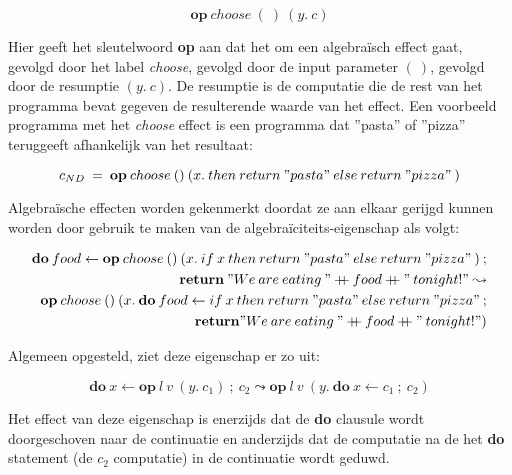 \begin{equation}
    \textbf{op} \: choose \: (\:) \: (y. \: c)
\end{equation}

Hier geeft het sleutelwoord \textbf{op} aan dat het om een algebraïsch effect gaat, gevolgd door het label \textit{choose}, gevolgd door de input parameter $(\:)$, gevolgd door de resumptie $(y. \: c)$. De resumptie is de computatie die de rest van het programma bevat gegeven de resulterende waarde van het effect. Een voorbeeld programma met het \textit{choose} effect is een programma dat ''pasta'' of ''pizza'' teruggeeft afhankelijk van het resultaat:

\begin{equation}
    c_{ND}\:=\:\textbf{op}\:choose\:()\:(x.\:then\:return\:"pasta"\:else\:return\:"pizza"\:)
\end{equation}

Algebraïsche effecten worden gekenmerkt doordat ze aan elkaar gerijgd kunnen worden door gebruik te maken van de algebraïciteits-eigenschap als volgt:

\begin{equation} \label{eq:algFood}
    \begin{split}
        \textbf{do}\:food \leftarrow \textbf{op}\:choose\:()\:(x. \: if \: x \:then\:return\:"pasta"\:else\:return\:"pizza"\:) \: ; \\ \: \textbf{return}\: "We \: are \: eating \: " \mathbin{{+}\mspace{-8mu}{+}}  food \mathbin{{+}\mspace{-8mu}{+}} " \: tonight!"  \leadsto \\
        \textbf{op}\:choose\:()\:(x.\: \textbf{do}\:food \leftarrow  if \: x \:then\:return\:"pasta"\:else\:return\:"pizza"\:; \\ \: \textbf{return} "We \: are \: eating \: " \mathbin{{+}\mspace{-8mu}{+}}  food \mathbin{{+}\mspace{-8mu}{+}} " \: tonight!" )
    \end{split}
\end{equation}

Algemeen opgesteld, ziet deze eigenschap er zo uit:

\begin{equation}
    \textbf{do}\:x \leftarrow \textbf{op}\:l\:v\:(y.\:c_{1})\:;\:c_{2} \leadsto  \textbf{op}\:l\:v\:(y.\: \textbf{do}\:x \leftarrow c_{1}\:;\:c_{2})
\end{equation}

Het effect van deze eigenschap is enerzijds dat de \textbf{do} clausule wordt doorgeschoven naar de continuatie en anderzijds dat de computatie na de het \textbf{do} statement (de $c_2$ computatie) in de continuatie wordt geduwd.

